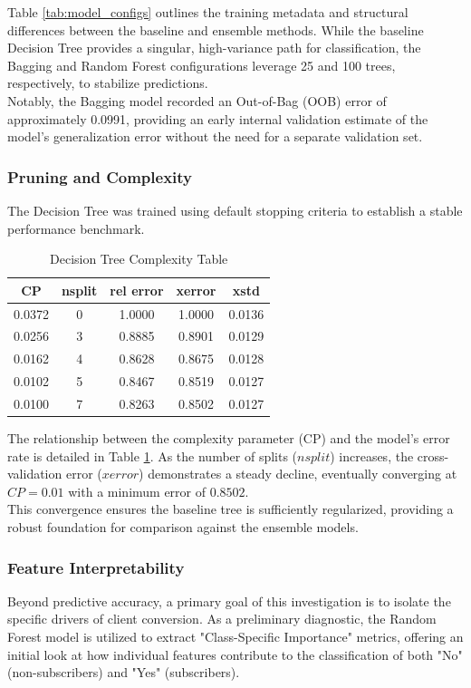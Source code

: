 \documentclass[conference]{IEEEtran}
\begin{document}
Table \ref{tab:model_configs} outlines the training metadata and structural differences between the baseline and ensemble methods. While the baseline Decision Tree provides a singular, high-variance path for classification, the Bagging and Random Forest configurations leverage 25 and 100 trees, respectively, to stabilize predictions.\\
\indent Notably, the Bagging model recorded an Out-of-Bag (OOB) error of approximately 0.0991, providing an early internal validation estimate of the model's generalization error without the need for a separate validation set.\\

\subsubsection*{\textbf{Pruning and Complexity}}
The Decision Tree was trained using default stopping criteria to establish a stable performance benchmark. 

\begin{table}[ht]
	\centering
	\caption{Decision Tree Complexity Table}
	\label{tab:cp_table}
	\begin{tabular}{ccccc}
		\hline \hline
		\textbf{CP} & \textbf{nsplit} & \textbf{rel error} & \textbf{xerror} & \textbf{xstd} \\
		\hline
		0.0372 & 0 & 1.0000 & 1.0000 & 0.0136 \\
		0.0256 & 3 & 0.8885 & 0.8901 & 0.0129 \\
		0.0162 & 4 & 0.8628 & 0.8675 & 0.0128 \\
		0.0102 & 5 & 0.8467 & 0.8519 & 0.0127 \\
		0.0100 & 7 & 0.8263 & 0.8502 & 0.0127 \\
		\hline \hline
	\end{tabular}
\end{table}

The relationship between the complexity parameter (CP) and the model's error rate is detailed in Table \ref{tab:cp_table}. As the number of splits ($nsplit$) increases, the cross-validation error ($xerror$) demonstrates a steady decline, eventually converging at $CP = 0.01$ with a minimum error of $0.8502$.\\
\indent This convergence ensures the baseline tree is sufficiently regularized, providing a robust foundation for comparison against the ensemble models.\\

\subsubsection*{\textbf{Feature Interpretability}}
Beyond predictive accuracy, a primary goal of this investigation is to isolate the specific drivers of client conversion. As a preliminary diagnostic, the Random Forest model is utilized to extract "Class-Specific Importance" metrics, offering an initial look at how individual features contribute to the classification of both "No" (non-subscribers) and "Yes" (subscribers).
\end{document}
